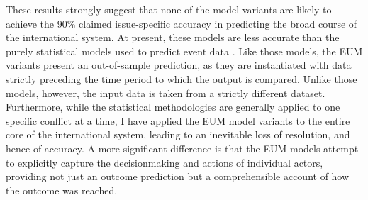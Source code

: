 These  results strongly suggest that none of the model variants are likely to achieve the 90\% claimed issue-specific accuracy \citep{feder_1992,bdm_2002} in predicting the broad course of the international system. At present, these models are less accurate than the purely statistical models used to predict event data \citep[e.g.][]{brandt_2011,ward_2013}. Like those models, the EUM variants present an out-of-sample prediction, as they are instantiated with data strictly preceding the time period to which the output is compared. Unlike those models, however, the input data is taken from a strictly different dataset. Furthermore, while the statistical methodologies are generally applied to one specific conflict at a time, I have applied the EUM model variants to the entire core of the international system, leading to an inevitable loss of resolution, and hence of accuracy. A more significant difference is that the EUM models attempt to explicitly capture the decisionmaking and actions of individual actors, providing not just an outcome prediction but a comprehensible account of how the outcome was reached.

